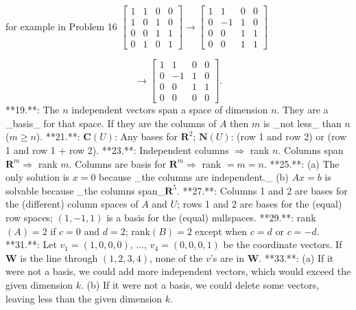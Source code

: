for example in Problem 16 \(\begin{bmatrix}1&1&0&0\\ 1&0&1&0\\ 0&0&1&1\\ 0&1&0&1\end{bmatrix}\to\begin{bmatrix}1&1&0&0\\ 0&-1&1&0\\ 0&0&1&1\\ 0&0&1&1\end{bmatrix}\)

\[\to\begin{bmatrix}1&1&0&0\\ 0&-1&1&0\\ 0&0&1&1\\ 0&0&0&0\end{bmatrix}\!\!.\]
**19.**: The \(n\) independent vectors span a space of dimension \(n\). They are a _basis_ for that space. If they are the columns of \(A\) then \(m\) is _not less_ than \(n\) (\(m\geq n\)).
**21.**: \(\boldsymbol{C}(U)\): Any bases for \(\mathbf{R}^{2}\); \(\boldsymbol{N}(U)\): (row 1 and row 2) or (row 1 and row 1 + row 2).
**23.**: Independent columns \(\Rightarrow\) rank \(n\). Columns span \(\mathbf{R}^{m}\Rightarrow\) rank \(m\). Columns are basis for \(\mathbf{R}^{m}\Rightarrow\) rank \(=m=n\).
**25.**: (a) The only solution is \(x=0\) because _the columns are independent._ (b) \(Ax=b\) is solvable because _the columns span_\(\mathbf{R}^{5}\).
**27.**: Columns 1 and 2 are bases for the (different) column spaces of \(A\) and \(U\); rows 1 and 2 are bases for the (equal) row spaces; \((1,-1,1)\) is a basis for the (equal) nullspaces.
**29.**: rank\((A)=2\) if \(c=0\) and \(d=2\); rank\((B)=2\) except when \(c=d\) or \(c=-d\).
**31.**: Let \(v_{1}=(1,0,0,0)\), ..., \(v_{4}=(0,0,0,1)\) be the coordinate vectors. If \(\mathbf{W}\) is the line through \((1,2,3,4)\), none of the \(v\)'s are in \(\mathbf{W}\).
**33.**: (a) If it were not a basis, we could add more independent vectors, which would exceed the given dimension \(k\). (b) If it were not a basis, we could delete some vectors, leaving less than the given dimension \(k\).

